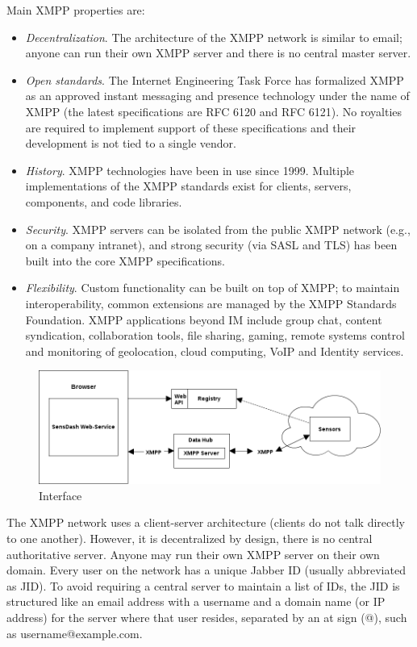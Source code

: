       Main XMPP properties are:
      \begin{itemize}
      \item \emph{Decentralization}. The architecture of the XMPP network is similar to email; anyone can run their own XMPP server and there is no central master server.
     \item \emph{Open standards}. The Internet Engineering Task Force has formalized XMPP as an approved instant messaging and presence technology under the name of XMPP (the latest specifications are RFC 6120 and RFC 6121). No royalties are required to implement support of these specifications and their development is not tied to a single vendor.
      \item \emph{History}. XMPP technologies have been in use since 1999. Multiple implementations of the XMPP standards exist for clients, servers, components, and code libraries.
      \item \emph{Security}. XMPP servers can be isolated from the public XMPP network (e.g., on a company intranet), and strong security (via SASL and TLS) has been built into the core XMPP specifications.
      \item \emph{Flexibility}. Custom functionality can be built on top of XMPP; to maintain interoperability, common extensions are managed by the XMPP Standards Foundation. XMPP applications beyond IM include group chat, content syndication, collaboration tools, file sharing, gaming, remote systems control and monitoring of geolocation, cloud computing, VoIP and Identity services.
      \end{itemize}

      \begin{figure}[!ht]
      \centering
      \includegraphics[scale=0.5]{images/Interface.png}   
      \caption[Interface]{Interface}
      \label{img:interfaces}                           
      \end{figure}

      The XMPP network uses a client-server architecture (clients do not talk directly to one another). However, it is decentralized by design, there is no central authoritative server. Anyone may run their own XMPP server on their own domain. Every user on the network has a unique Jabber ID (usually abbreviated as JID). To avoid requiring a central server to maintain a list of IDs, the JID is structured like an email address with a username and a domain name (or IP address) for the server where that user resides, separated by an at sign (@), such as username@example.com.  

